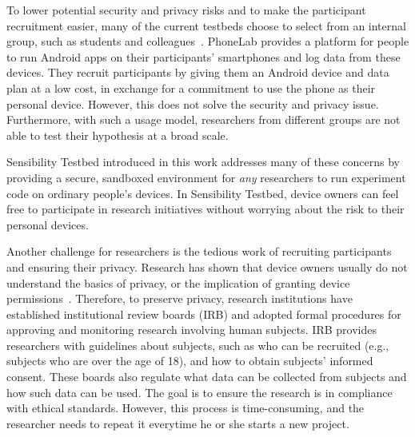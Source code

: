 To lower potential security and privacy risks and to make the 
participant recruitment easier, many of the current testbeds choose to 
select from an internal group, such as students and 
colleagues~\cite{hao2013isleep, wang2012no, 
wang2013sensing}. PhoneLab provides a platform for 
people to run Android apps on their participants' smartphones 
and log data from these devices. They recruit participants by 
giving them an Android device and data plan at a low cost, in 
exchange for a commitment to use the phone as their personal 
device. However, this does not solve the security and privacy issue. 
Furthermore, with such a usage model, researchers from different  
groups are not able to test their hypothesis at a broad scale.

Sensibility Testbed introduced in this work addresses many of 
these concerns by providing a secure, sandboxed environment 
for \textit{any} researchers to run experiment code on ordinary people's 
devices. In Sensibility Testbed, device owners can feel free to 
participate in research initiatives without worrying about the risk 
to their personal devices.

Another challenge for researchers is the tedious work
of recruiting participants and ensuring their privacy. 
Research has shown that device owners usually do not understand the 
basics of privacy, or the implication of granting device 
permissions~\cite{camp2015respecting}. 
Therefore, to preserve privacy, research institutions have established 
institutional review boards (IRB) \cite{irb} and adopted formal 
procedures for approving and monitoring research involving 
human subjects. IRB provides researchers with guidelines about 
subjects, such as who can be recruited (e.g., subjects
who are over the age of 18), and 
how to obtain subjects' informed consent. These boards also 
regulate what data can be collected from subjects and how 
such data can be used. The goal is
to ensure the research is in compliance with ethical standards. 
However, this process is time-consuming, and the researcher needs 
to repeat it everytime he or she starts a new project. 

